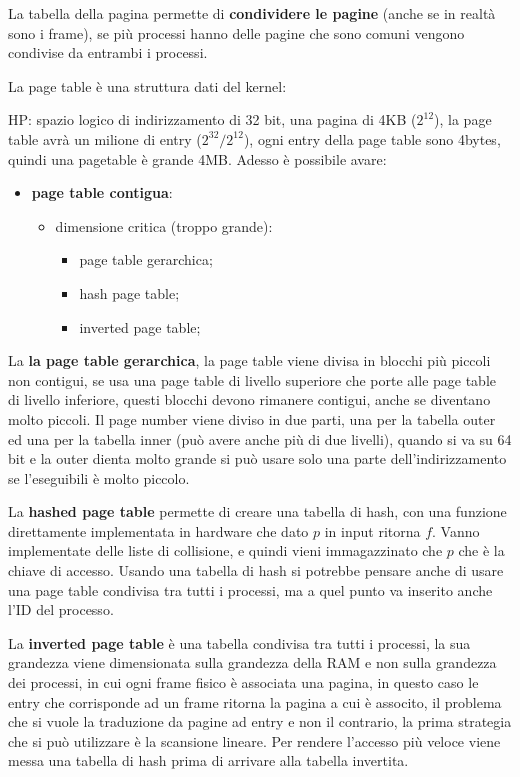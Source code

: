 \documentclass[12pt]{article}
\begin{document}
La tabella della pagina permette di \textbf{condividere le pagine} (anche se in realt\`a sono i frame), se pi\`u processi hanno delle pagine che sono comuni vengono condivise da entrambi i processi.

La page table \`e una struttura dati del kernel:
\begin{example}{}{}
  HP: spazio logico di indirizzamento di 32 bit, una pagina di 4KB ($2^{12}$), la page table avr\`a un milione di entry ($2^{32}/2^{12}$), ogni entry della page table sono 4bytes, quindi una pagetable \`e grande 4MB. Adesso \`e possibile avare:
  \begin{itemize}
    \item \textbf{page table contigua}:
      \begin{itemize}
        \item dimensione critica (troppo grande):
          \begin{itemize}
            \item page table gerarchica;
            \item hash page table;
            \item inverted page table;
          \end{itemize}
      \end{itemize}
  \end{itemize}
\end{example}
La \textbf{la page table gerarchica}, la page table viene divisa in blocchi pi\`u piccoli non contigui, se usa una page table di livello superiore che porte alle page table di livello inferiore, questi blocchi devono rimanere contigui, anche se diventano molto piccoli. Il page number viene diviso in due parti, una per la tabella outer ed una per la tabella inner (pu\`o avere anche pi\`u di due livelli), quando si va su 64 bit e la outer dienta molto grande si pu\`o usare solo una parte dell'indirizzamento se l'eseguibili \`e molto piccolo.

La \textbf{hashed page table} permette di creare una tabella di hash, con una funzione direttamente implementata in hardware che dato $p$ in input ritorna $f$. Vanno implementate delle liste di collisione, e quindi vieni immagazzinato che $p$ che \`e la chiave di accesso. Usando una tabella di hash si potrebbe pensare anche di usare una page table condivisa tra tutti i processi, ma a quel punto va inserito anche l'ID del processo.

La \textbf{inverted page table} \`e una tabella condivisa tra tutti i processi, la sua grandezza viene dimensionata sulla grandezza della RAM e non sulla grandezza dei processi, in cui ogni frame fisico \`e associata una pagina, in questo caso le entry che corrisponde ad un frame ritorna la pagina a cui \`e associto, il problema che si vuole la traduzione da pagine ad entry e non il contrario, la prima strategia che si pu\`o utilizzare \`e la scansione lineare. Per rendere l'accesso pi\`u veloce viene messa una tabella di hash prima di arrivare alla tabella invertita.
\end{document}
